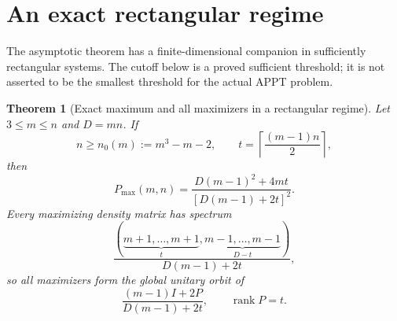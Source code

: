\documentclass[11pt]{article}
\newtheorem{theorem}{Theorem}[section]
\theoremstyle{remark}\newtheorem{remark}[theorem]{Remark}
\begin{document}
\section{An exact rectangular regime}
\label{sec:rectangular}
The asymptotic theorem has a finite-dimensional companion in sufficiently rectangular systems. The cutoff below is a proved sufficient threshold; it is not asserted to be the smallest threshold for the actual APPT problem.

\begin{theorem}[Exact maximum and all maximizers in a rectangular regime]\label{thm:rectangular}
Let $3\leq m\leq n$ and $D=mn$. If
\[
 n\geq n_0(m):=m^3-m-2,
 \qquad t=\left\lceil\frac{(m-1)n}{2}\right\rceil,
\]
then
\begin{equation}\label{eq:rectangular-max}
 P_{\max}(m,n)=\frac{D(m-1)^2+4mt}{[D(m-1)+2t]^2}.
\end{equation}
Every maximizing density matrix has spectrum
\begin{equation}\label{eq:rectangular-spectrum}
 \frac{(\underbrace{m+1,\ldots,m+1}_{t},
 \underbrace{m-1,\ldots,m-1}_{D-t})}{D(m-1)+2t},
\end{equation}
so all maximizers form the global unitary orbit of
\[
 \frac{(m-1)I+2P}{D(m-1)+2t},
 \qquad \operatorname{rank}P=t.
\]
\end{theorem}
\end{document}
